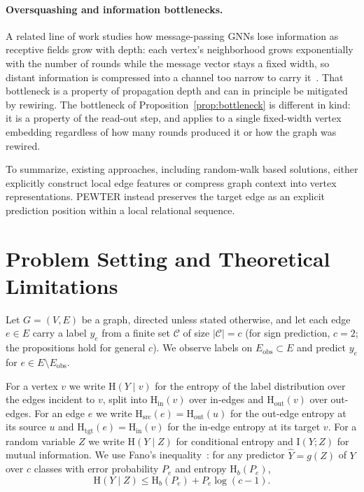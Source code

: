 \documentclass[sigconf]{acmart}
\newcommand{\Hh}{\mathrm{H}}
\newcommand{\MI}{\mathrm{I}}
\newcommand{\indeg}{\mathrm{in}}
\newcommand{\outdeg}{\mathrm{out}}
\theoremstyle{plain}
\theoremstyle{definition}
\begin{document}
\paragraph{Oversquashing and information bottlenecks.} A related line of work studies how message-passing GNNs lose information as receptive fields grow with depth: each vertex's neighborhood grows exponentially with the number of rounds while the message vector stays a fixed width, so distant information is compressed into a channel too narrow to carry it~\citep{alon2021bottleneck, topping2022understanding}. That bottleneck is a property of propagation depth and can in principle be mitigated by rewiring. The bottleneck of Proposition~\ref{prop:bottleneck} is different in kind: it is a property of the read-out step, and applies to a single fixed-width vertex embedding regardless of how many rounds produced it or how the graph was rewired.

To summarize, existing approaches, including random-walk based solutions, either explicitly construct local edge features or compress graph context into vertex representations. PEWTER instead preserves the target edge as an explicit prediction position within a local relational sequence.
\section{Problem Setting and Theoretical Limitations}
\label{sec:notation}
Let $G=(V,E)$ be a graph, directed unless stated otherwise, and let each edge $e\in E$ carry a label $y_e$ from a finite set $\mathcal{C}$ of size $|\mathcal{C}|=c$ (for sign prediction, $c=2$; the propositions hold for general $c$). We observe labels on $E_{\mathrm{obs}}\subset E$ and predict $y_e$ for $e\in E\setminus E_{\mathrm{obs}}$.

\label{def:vertex-entropy}For a vertex $v$ we write $\Hh(Y\mid v)$ for the entropy of the label distribution over the edges incident to $v$, split into $\Hh_\indeg(v)$ over in-edges and $\Hh_\outdeg(v)$ over out-edges. For an edge $e$ we write $\Hh_{\mathrm{src}}(e)=\Hh_\outdeg(u)$ for the out-edge entropy at its source $u$ and $\Hh_{\mathrm{tgt}}(e)=\Hh_\indeg(v)$ for the in-edge entropy at its target $v$. For a random variable $Z$ we write $\Hh(Y\mid Z)$ for conditional entropy and $\MI(Y;Z)$ for mutual information. We use Fano's inequality~\citep{cover2006elements}: for any predictor $\hat Y=g(Z)$ of $Y$ over $c$ classes with error probability $P_e$ and entropy $\Hh_b(P_e)$,
\begin{equation}
\Hh(Y\mid Z)\le \Hh_b(P_e)+P_e\log(c-1).
\label{eq:fano}
\end{equation}
\end{document}
